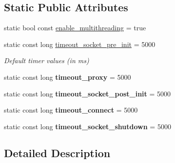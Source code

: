 \subsection*{Static Public Attributes}
\begin{DoxyCompactItemize}
\item 
static bool const \hyperlink{structdebug__config__client_1_1transport__config_ac6bf68dc4640a580404ffe36fab45736}{enable\+\_\+multithreading} = true
\item 
static const long \hyperlink{structdebug__config__client_1_1transport__config_acbdade5846ed4d3583680350942ebc68}{timeout\+\_\+socket\+\_\+pre\+\_\+init} = 5000\hypertarget{structdebug__config__client_1_1transport__config_acbdade5846ed4d3583680350942ebc68}{}\label{structdebug__config__client_1_1transport__config_acbdade5846ed4d3583680350942ebc68}

\begin{DoxyCompactList}\small\item\em Default timer values (in ms) \end{DoxyCompactList}\item 
static const long {\bfseries timeout\+\_\+proxy} = 5000\hypertarget{structdebug__config__client_1_1transport__config_a7968b5468d7b7ceac5ef7cf4bc3c43ec}{}\label{structdebug__config__client_1_1transport__config_a7968b5468d7b7ceac5ef7cf4bc3c43ec}

\item 
static const long {\bfseries timeout\+\_\+socket\+\_\+post\+\_\+init} = 5000\hypertarget{structdebug__config__client_1_1transport__config_a0c3b92451b7863ed6525319a397cf7ff}{}\label{structdebug__config__client_1_1transport__config_a0c3b92451b7863ed6525319a397cf7ff}

\item 
static const long {\bfseries timeout\+\_\+connect} = 5000\hypertarget{structdebug__config__client_1_1transport__config_a04588d10fcac41c3b2c636cb53a522c0}{}\label{structdebug__config__client_1_1transport__config_a04588d10fcac41c3b2c636cb53a522c0}

\item 
static const long {\bfseries timeout\+\_\+socket\+\_\+shutdown} = 5000\hypertarget{structdebug__config__client_1_1transport__config_a93691c475e5a145dacb758f3485727ef}{}\label{structdebug__config__client_1_1transport__config_a93691c475e5a145dacb758f3485727ef}

\end{DoxyCompactItemize}


\subsection{Detailed Description}


